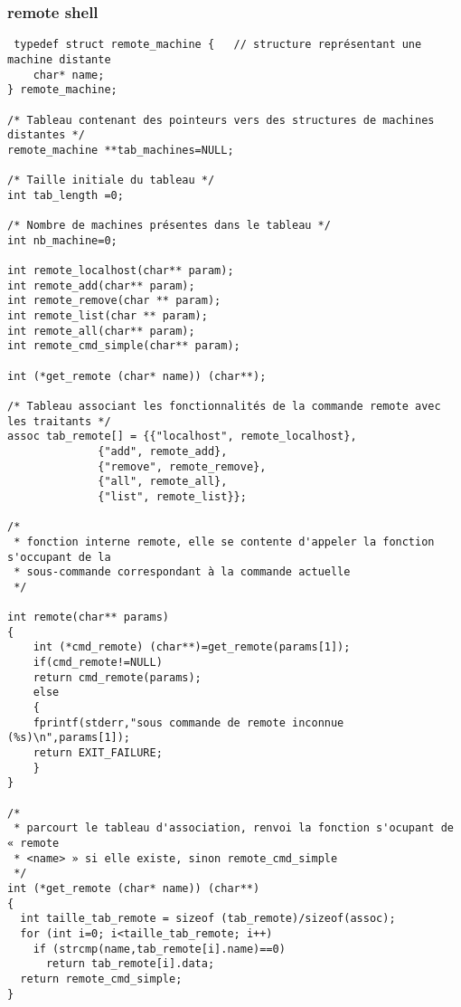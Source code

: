 \documentclass[12pt]{article}
\begin{document}
\subsubsection{remote shell}
\label{remote shell}
\begin{verbatim}
 typedef struct remote_machine {   // structure représentant une machine distante
    char* name;
} remote_machine;

/* Tableau contenant des pointeurs vers des structures de machines distantes */
remote_machine **tab_machines=NULL;

/* Taille initiale du tableau */
int tab_length =0;

/* Nombre de machines présentes dans le tableau */
int nb_machine=0;

int remote_localhost(char** param);
int remote_add(char** param);
int remote_remove(char ** param);
int remote_list(char ** param);
int remote_all(char** param);
int remote_cmd_simple(char** param);
			  
int (*get_remote (char* name)) (char**);

/* Tableau associant les fonctionnalités de la commande remote avec les traitants */ 			  
assoc tab_remote[] = {{"localhost", remote_localhost},
		      {"add", remote_add},
		      {"remove", remote_remove},
		      {"all", remote_all},
		      {"list", remote_list}};

/*
 * fonction interne remote, elle se contente d'appeler la fonction s'occupant de la 
 * sous-commande correspondant à la commande actuelle
 */
 
int remote(char** params)
{
    int (*cmd_remote) (char**)=get_remote(params[1]);
    if(cmd_remote!=NULL)
	return cmd_remote(params);
    else
    {
	fprintf(stderr,"sous commande de remote inconnue (%s)\n",params[1]);
	return EXIT_FAILURE;
    }
}

/*
 * parcourt le tableau d'association, renvoi la fonction s'ocupant de « remote
 * <name> » si elle existe, sinon remote_cmd_simple
 */
int (*get_remote (char* name)) (char**) 
{
  int taille_tab_remote = sizeof (tab_remote)/sizeof(assoc);
  for (int i=0; i<taille_tab_remote; i++)
    if (strcmp(name,tab_remote[i].name)==0)
      return tab_remote[i].data;
  return remote_cmd_simple;
}
\end{verbatim}
\end{document}
